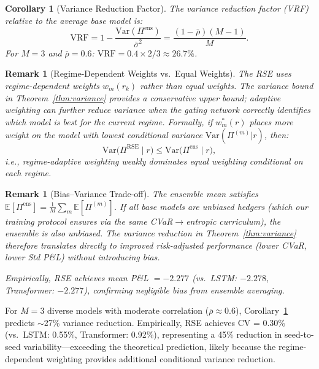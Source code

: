 \documentclass[11pt]{article}
\newtheorem{corollary}[theorem]{Corollary}
\newtheorem{remark}[theorem]{Remark}
\newcommand{\E}{\mathbb{E}}
\begin{document}
\begin{corollary}[Variance Reduction Factor]
\label{cor:vrf}
The variance reduction factor (VRF) relative to the average base model is:
\begin{equation}
    \mathrm{VRF} = 1 - \frac{\mathrm{Var}(\Pi^{\mathrm{ens}})}{\bar\sigma^2} = \frac{(1-\bar\rho)(M-1)}{M}.
\end{equation}
For $M=3$ and $\bar\rho = 0.6$: $\mathrm{VRF} = 0.4 \times 2/3 \approx 26.7\%$.
\end{corollary}

\begin{remark}[Regime-Dependent Weights vs.\ Equal Weights]
The RSE uses \emph{regime-dependent} weights $w_m(r_k)$ rather than equal weights.  The variance bound in Theorem~\ref{thm:variance} provides a conservative upper bound; adaptive weighting can further reduce variance when the gating network correctly identifies which model is best for the current regime.  Formally, if $w^*_m(r)$ places more weight on the model with lowest conditional variance $\mathrm{Var}(\Pi^{(m)}|r)$, then:
\begin{equation}
    \mathrm{Var}\bigl(\Pi^{\mathrm{RSE}} \mid r\bigr) \le \mathrm{Var}\bigl(\Pi^{\mathrm{ens}}\mid r\bigr),
\end{equation}
i.e., regime-adaptive weighting weakly dominates equal weighting conditional on each regime.
\end{remark}

\begin{remark}[Bias--Variance Trade-off]
The ensemble mean satisfies $\E[\Pi^{\mathrm{ens}}] = \frac{1}{M}\sum_m\E[\Pi^{(m)}]$.  If all base models are unbiased hedgers (which our training protocol ensures via the same CVaR$\to$entropic curriculum), the ensemble is also unbiased.  The variance reduction in Theorem~\ref{thm:variance} therefore translates directly to improved risk-adjusted performance (lower CVaR, lower Std P\&L) without introducing bias.

Empirically, RSE achieves mean P\&L $= -2.277$ (vs.\ LSTM: $-2.278$, Transformer: $-2.277$), confirming negligible bias from ensemble averaging.
\end{remark}

For $M = 3$ diverse models with moderate correlation ($\bar{\rho} \approx 0.6$), Corollary~\ref{cor:vrf} predicts $\sim$27\% variance reduction.  Empirically, RSE achieves CV = 0.30\% (vs.\ LSTM: 0.55\%, Transformer: 0.92\%), representing a 45\% reduction in seed-to-seed variability---exceeding the theoretical prediction, likely because the regime-dependent weighting provides additional conditional variance reduction.
\end{document}
